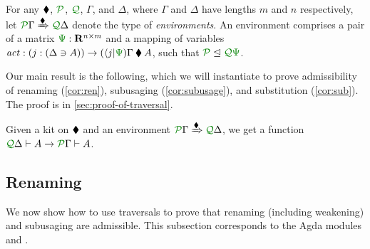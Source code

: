 \documentclass[submission,copyright,creativecommons]{eptcs}
\begin{document}
\begin{definition}\label{def:env}
  For any $\mathbin{\blacklozenge}$, $\resctx P$, $\resctx Q$, $\Gamma$, and $\Delta$,
  where $\Gamma$ and $\Delta$ have lengths $m$ and $n$ respectively,
  let $\ctx{\Gamma}{P} \subst{\kitrel} \ctx{\Delta}{Q}$ denote the
  type of \emph{environments}.  An environment comprises a pair of a
  matrix $\rescomment\Psi : \mathbf R^{n \times m}$ and a mapping of
  variables
  $\mathit{act} : (j : (\Delta \ni A)) \to (\langle j
  \rvert\rescomment\Psi)\Gamma \kitrel A$, such that
  $\resctx P \subres \resctx Q \rescomment\Psi$.
\end{definition}

Our main result is the following, which we will instantiate to prove
admissibility of renaming (\autoref{cor:ren}), subusaging
(\autoref{cor:subusage}), and substitution (\autoref{cor:sub}). The
proof is in \autoref{sec:proof-of-traversal}.

\newcommand{\thmtrav}{%
  Given a kit on $\kitrel$ and an environment
  $\ctx{\Gamma}{P} \subst{\kitrel} \ctx{\Delta}{Q}$, we get a function
  $\ctx{\Delta}{Q} \vdash A \to \ctx{\Gamma}{P} \vdash A$.%
}
\begin{theorem}\label{thm:trav}
  \thmtrav
\end{theorem}

\subsection{Renaming}

We now show how to use traversals to prove that renaming (including
weakening) and subusaging are admissible.
This subsection corresponds to the Agda modules
\href{https://github.com/laMudri/generic-lr/blob/lin/tlla-submission-2021/src/Specific/Syntax/Renaming.agda\#L9}{}
and
\href{https://github.com/laMudri/generic-lr/blob/lin/tlla-submission-2021/src/Specific/Syntax/Subuse.agda\#L9}{}.
\end{document}
